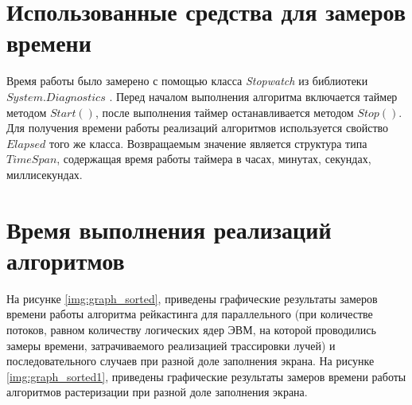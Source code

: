 \section{Использованные средства для замеров времени}
Время работы было замерено с помощью класса \textit{Stopwatch} из библиотеки $System.Diagnostics$ \cite{time}. Перед началом выполнения алгоритма включается таймер методом $Start()$, после выполнения таймер останавливается методом $Stop()$. Для получения времени работы реализаций алгоритмов используется свойство $Elapsed$ того же класса. Возвращаемым значение является структура типа $TimeSpan$, содержащая время работы таймера в часах, минутах, секундах, миллисекундах.

\section{Время выполнения реализаций алгоритмов}
На рисунке \ref{img:graph_sorted}, приведены графические результаты замеров времени работы
алгоритма рейкастинга для параллельного (при количестве потоков, равном количеству
логических ядер ЭВМ, на которой проводились замеры времени, затрачиваемого
реализацией трассировки лучей) и последовательного случаев при разной доле заполнения экрана. На рисунке \ref{img:graph_sorted1}, приведены графические результаты замеров времени работы
алгоритмов растеризации при разной доле заполнения экрана. 


\begin{center}
	\label{img:graph_sorted}
\end{center}

